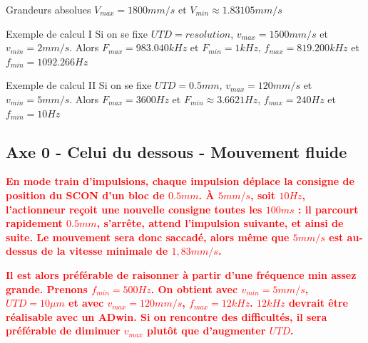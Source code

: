 \documentclass[a4paper,11pt]{beamer}
\begin{document}
\begin{frame}
\begin{alertblock}{Grandeurs absolues}
$V_{max} = 1800mm/s$ et $V_{min} \approx 1.83105mm/s$
\end{alertblock}

\begin{exampleblock}{Exemple de calcul I}
Si on se fixe $UTD = resolution$, $v_{max} = 1500mm/s$ et $v_{min} = 2mm/s$. Alors
$F_{max} = 983.040kHz$ et $F_{min} = 1kHz$,
$f_{max} = 819.200kHz$ et $f_{min} = 1092.266Hz$
\end{exampleblock}

\begin{exampleblock}{Exemple de calcul II}
Si on se fixe $UTD = 0.5mm$, $v_{max} = 120mm/s$ et $v_{min} = 5mm/s$. Alors $F_{max} = 3600Hz$ et $F_{min} \approx 3.6621Hz$, $f_{max} = 240Hz$ et $f_{min} = 10Hz$
\end{exampleblock}
\end{frame}

\subsection{Axe 0 - Celui du dessous - Mouvement fluide}
\begin{frame}
\justifying
\textbf{\textcolor{red}{
En mode train d'impulsions, chaque impulsion déplace la consigne de position du SCON d'un bloc de $0.5 mm$. À $5 mm/s$, soit $10 Hz$, l'actionneur reçoit une nouvelle consigne toutes les $100 ms$ : il parcourt rapidement $0.5 mm$, s'arrête, attend l'impulsion suivante, et ainsi de suite. Le mouvement sera donc saccadé, alors même que $5 mm/s$ est au-dessus de la vitesse minimale de $1,83mm/s$.}}
\vspace{0.5cm}

\textbf{\textcolor{red}{
Il est alors préférable de raisonner à partir d'une fréquence min assez grande. Prenons $f_{min} = 500Hz$. On obtient avec $v_{min}=5mm/s$, $UTD=10\mu m$ et avec $v_{max}=120mm/s$, $f_{max}=12kHz$. $12kHz$ devrait être réalisable avec un ADwin. Si on rencontre des difficultés, il sera préférable de diminuer $v_{max}$ plutôt que d'augmenter $UTD$.}}
\end{frame}
\end{document}
